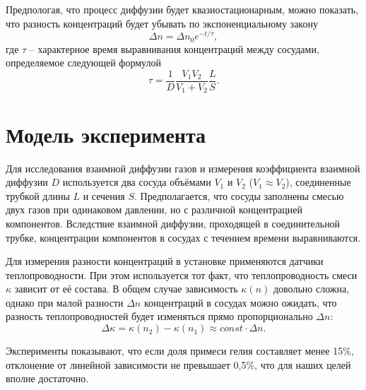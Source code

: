 \documentclass[a4paper, 12pt]{article}
\begin{document}
        Предпологая, что процесс диффузии будет квазиостационарным, можно показать, что разность концентраций будет убывать по экспоненциальному закону
        \begin{equation}
            \label{Delta_n}
            \Delta n = \Delta n_0 e^{-t / \tau},
        \end{equation}
        где $\tau$ -- характерное время выравнивания концентраций между сосудами, определяемое следующей формулой
        \begin{equation}
            \label{Tau}
            \tau = \frac{1}{D} \frac{V_1V_2}{V_1 + V_2} \frac{L}{S}.
        \end{equation}

    \section{Модель эксперимента}
        Для   исследования   взаимной диффузии газов и измерения коэффициента взаимной диффузии  $D$  используется  два сосуда  объёмами  $V_1$ и $V_2$ ($V_1 \approx V_2$), соединенные трубкой длины $L$ и сечения  $S$. Предполагается, что сосуды заполнены смесью двух газов при одинаковом давлении, но с различной концентрацией компонентов. Вследствие взаимной диффузии, проходящей в   соединительной трубке, концентрации компонентов в сосудах с течением времени выравниваются.

        Для измерения разности  концентраций  в установке применяются датчики теплопроводности. При этом используется тот факт, что теплопроводность смеси $\kappa$ зависит от её состава. В общем случае   зависимость  $\kappa (n)$  довольно   сложна,   однако   при   малой   разности  $\Delta n$ концентраций в сосудах можно ожидать, что разность теплопроводностей будет изменяться прямо пропорционально $\Delta n:$
        \begin{equation*}
            \Delta \kappa = \kappa (n_2) - \kappa (n_1) \approx const \cdot \Delta n.
        \end{equation*}

        Эксперименты показывают, что если доля примеси гелия составляет менее 15\%, отклонение от линейной зависимости не превышает 0,5\%, что для наших целей вполне достаточно.
\end{document}
